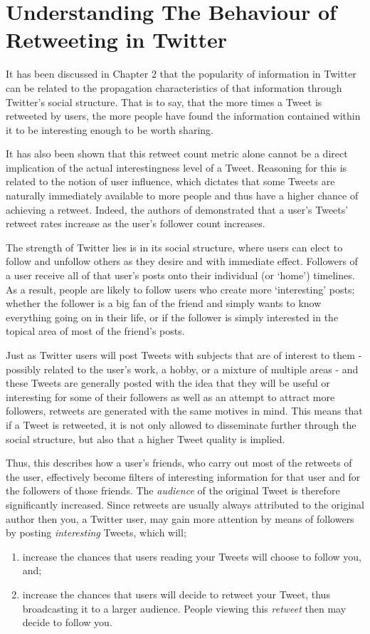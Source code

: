 \chapter{Understanding The Behaviour of Retweeting in Twitter}


It has been discussed in Chapter 2 that the popularity of information in Twitter can be related to the propagation characteristics of that information through Twitter's social structure. That is to say, that the more times a Tweet is retweeted by users, the more people have found the information contained within it to be interesting enough to be worth sharing.

It has also been shown that this retweet count metric alone cannot be a direct implication of the actual interestingness level of a Tweet. Reasoning for this is related to the notion of user influence, which dictates that some Tweets are naturally immediately available to more people and thus have a higher chance of achieving a retweet. Indeed, the authors of \cite{suh10} demonstrated that a user's Tweets' retweet rates increase as the user's follower count increases.

The strength of Twitter lies is in its social structure, where users can elect to follow and unfollow others as they desire and with immediate effect. Followers of a user receive all of that user's posts onto their individual (or `home') timelines. As a result, people are likely to follow users who create more `interesting' posts; whether the follower is a big fan of the friend and simply wants to know everything going on in their life, or if the follower is simply interested in the topical area of most of the friend's posts. 

Just as Twitter users will post Tweets with subjects that are of interest to them - possibly related to the user's work, a hobby, or a mixture of multiple areas - and these Tweets are generally posted with the idea that they will be useful or interesting for some of their followers as well as an attempt to attract more followers, retweets are generated with the same motives in mind. This means that if a Tweet is retweeted, it is not only allowed to disseminate further through the social structure, but also that a higher Tweet quality is implied.

Thus, this describes how a user's friends, who carry out most of the retweets of the user, effectively become filters of interesting information for that user and for the followers of those friends. The \textit{audience} of the original Tweet is therefore significantly increased. Since retweets are usually always attributed to the original author then you, a Twitter user, may gain more attention by means of followers by posting \textit{interesting} Tweets, which will; 
\begin{enumerate}
\item increase the chances that users reading your Tweets will choose to follow you, and;
\item increase the chances that users will decide to retweet your Tweet, thus broadcasting it to a larger audience. People viewing this \textit{retweet} then may decide to follow you. 
\end{enumerate}

